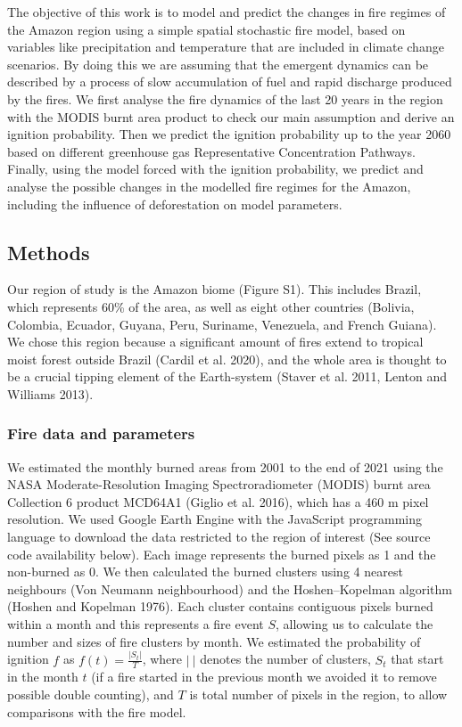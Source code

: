 \documentclass[
]{article}
\begin{document}
The objective of this work is to model and predict the changes in fire
regimes of the Amazon region using a simple spatial stochastic fire
model, based on variables like precipitation and temperature that are
included in climate change scenarios. By doing this we are assuming that
the emergent dynamics can be described by a process of slow accumulation
of fuel and rapid discharge produced by the fires. We first analyse the
fire dynamics of the last 20 years in the region with the MODIS burnt
area product to check our main assumption and derive an ignition
probability. Then we predict the ignition probability up to the year
2060 based on different greenhouse gas Representative Concentration
Pathways. Finally, using the model forced with the ignition probability,
we predict and analyse the possible changes in the modelled fire regimes
for the Amazon, including the influence of deforestation on model
parameters.

\subsection{Methods}\label{methods}

Our region of study is the Amazon biome (Figure S1). This includes
Brazil, which represents 60\% of the area, as well as eight other
countries (Bolivia, Colombia, Ecuador, Guyana, Peru, Suriname,
Venezuela, and French Guiana). We chose this region because a
significant amount of fires extend to tropical moist forest outside
Brazil (Cardil et al. 2020), and the whole area is thought to be a
crucial tipping element of the Earth-system (Staver et al. 2011, Lenton
and Williams 2013).

\subsubsection{Fire data and parameters}\label{fire-data-and-parameters}

We estimated the monthly burned areas from 2001 to the end of 2021 using
the NASA Moderate-Resolution Imaging Spectroradiometer (MODIS) burnt
area Collection 6 product MCD64A1 (Giglio et al. 2016), which has a 460
m pixel resolution. We used Google Earth Engine with the JavaScript
programming language to download the data restricted to the region of
interest (See source code availability below). Each image represents the
burned pixels as 1 and the non-burned as 0. We then calculated the
burned clusters using 4 nearest neighbours (Von Neumann neighbourhood)
and the Hoshen--Kopelman algorithm (Hoshen and Kopelman 1976). Each
cluster contains contiguous pixels burned within a month and this
represents a fire event \(S\), allowing us to calculate the number and
sizes of fire clusters by month. We estimated the probability of
ignition \(f\) as \(f(t) = \frac{|S_t|}{T}\), where \(|\ |\) denotes the
number of clusters, \(S_t\) that start in the month \(t\) (if a fire
started in the previous month we avoided it to remove possible double
counting), and \(T\) is total number of pixels in the region, to allow
comparisons with the fire model.
\end{document}
